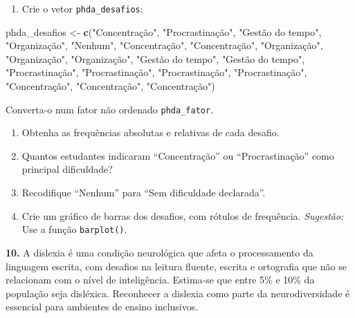 \documentclass[
  portuguese,
  11pt,
  openany]{book}
\newenvironment{Shaded}{\begin{snugshade}}{\end{snugshade}}
\newcommand{\FunctionTok}[1]{\textcolor[rgb]{0.13,0.29,0.53}{\textbf{#1}}}
\newcommand{\NormalTok}[1]{#1}
\newcommand{\OtherTok}[1]{\textcolor[rgb]{0.56,0.35,0.01}{#1}}
\newcommand{\StringTok}[1]{\textcolor[rgb]{0.31,0.60,0.02}{#1}}
\providecommand{\tightlist}{%
  \setlength{\itemsep}{0pt}\setlength{\parskip}{0pt}}
\begin{document}
\begin{enumerate}
\def\labelenumi{(\alph{enumi})}
\tightlist
\item
  Crie o vetor \texttt{phda\_desafios}:
\end{enumerate}

\begin{Shaded}
\begin{Highlighting}[]
\NormalTok{phda\_desafios }\OtherTok{\textless{}{-}} \FunctionTok{c}\NormalTok{(}\StringTok{"Concentração"}\NormalTok{, }\StringTok{"Procrastinação"}\NormalTok{, }\StringTok{"Gestão do tempo"}\NormalTok{, }\StringTok{"Organização"}\NormalTok{,}
  \StringTok{"Nenhum"}\NormalTok{, }\StringTok{"Concentração"}\NormalTok{, }\StringTok{"Concentração"}\NormalTok{, }\StringTok{"Organização"}\NormalTok{, }\StringTok{"Organização"}\NormalTok{, }\StringTok{"Organização"}\NormalTok{,}
  \StringTok{"Gestão do tempo"}\NormalTok{, }\StringTok{"Gestão do tempo"}\NormalTok{, }\StringTok{"Procrastinação"}\NormalTok{, }\StringTok{"Procrastinação"}\NormalTok{,}
  \StringTok{"Procrastinação"}\NormalTok{, }\StringTok{"Procrastinação"}\NormalTok{, }\StringTok{"Concentração"}\NormalTok{, }\StringTok{"Concentração"}\NormalTok{, }\StringTok{"Concentração"}\NormalTok{)}
\end{Highlighting}
\end{Shaded}

Converta-o num fator não ordenado \texttt{phda\_fator}.

\begin{enumerate}
\def\labelenumi{(\alph{enumi})}
\setcounter{enumi}{1}
\tightlist
\item
  Obtenha as frequências absolutas e relativas de cada desafio.
\item
  Quantos estudantes indicaram ``Concentração'' ou ``Procrastinação'' como principal dificuldade?
\item
  Recodifique ``Nenhum'' para ``Sem dificuldade declarada''.
\item
  Crie um gráfico de barras dos desafios, com rótulos de frequência.
  \emph{Sugestão:} Use a função \texttt{barplot()}.
\end{enumerate}

\textbf{10.} A dislexia é uma condição neurológica que afeta o processamento da
linguagem escrita, com desafios na leitura fluente, escrita e ortografia que não
se relacionam com o nível de inteligência. Estima-se que entre 5\% e 10\% da
população seja disléxica. Reconhecer a dislexia como parte da neurodiversidade é
essencial para ambientes de ensino inclusivos.
\end{document}
